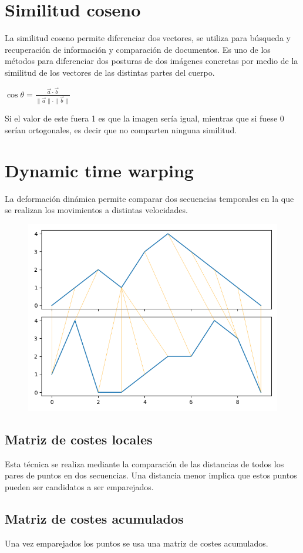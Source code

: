 \section{Similitud coseno}
La similitud coseno permite diferenciar dos vectores, se utiliza para búsqueda y recuperación de información y comparación de documentos.
Es uno de los métodos para diferenciar dos posturas de dos imágenes concretas por medio de la similitud de los vectores de las distintas partes del cuerpo.

$\cos \theta = \frac{\vec{a} \cdot \vec{b}}{\lVert \vec{a} \lVert \cdot \lVert \vec{b} \lVert}$

Si el valor de este fuera 1 es que la imagen sería igual, mientras que si fuese 0 serían ortogonales, es decir que no comparten ninguna similitud.

\section{Dynamic time warping}
La deformación dinámica permite comparar dos secuencias temporales en la que se realizan los movimientos a distintas velocidades.

\begin{figure}
	\centering
	\includegraphics[width=0.7\linewidth]{img/warp}
	\caption{}
	\label{fig:warp}
\end{figure}

\subsection{Matriz de costes locales}
Esta técnica se realiza mediante la comparación de las distancias de todos los pares de puntos en dos secuencias. Una distancia menor implica que estos puntos pueden ser candidatos a ser emparejados. \cite{dwt:dwtdescription}


\subsection{Matriz de costes acumulados}
Una vez emparejados los puntos se usa una matriz de costes acumulados.\cite{s19132882}

